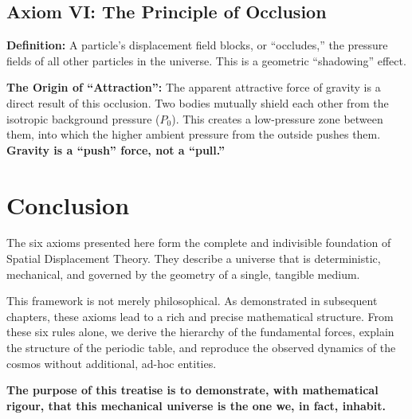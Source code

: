 \subsection{Axiom VI: The Principle of Occlusion}

\textbf{Definition:} A particle's displacement field blocks, or ``occludes,'' the pressure fields of all other particles in the universe.  This is a geometric ``shadowing'' effect.

\textbf{The Origin of ``Attraction'':} The apparent attractive force of gravity is a direct result of this occlusion.  Two bodies mutually shield each other from the isotropic background pressure ($P_0$).  This creates a low-pressure zone between them, into which the higher ambient pressure from the outside pushes them.  \textbf{Gravity is a ``push'' force, not a ``pull.''}


\section{Conclusion}

The six axioms presented here form the complete and indivisible foundation of Spatial Displacement Theory.  They describe a universe that is deterministic, mechanical, and governed by the geometry of a single, tangible medium.

This framework is not merely philosophical.  As demonstrated in subsequent chapters, these axioms lead to a rich and precise mathematical structure.  From these six rules alone, we derive the hierarchy of the fundamental forces, explain the structure of the periodic table, and reproduce the observed dynamics of the cosmos without additional, ad-hoc entities.

\textbf{The purpose of this treatise is to demonstrate, with mathematical rigour, that this mechanical universe is the one we, in fact, inhabit.}
